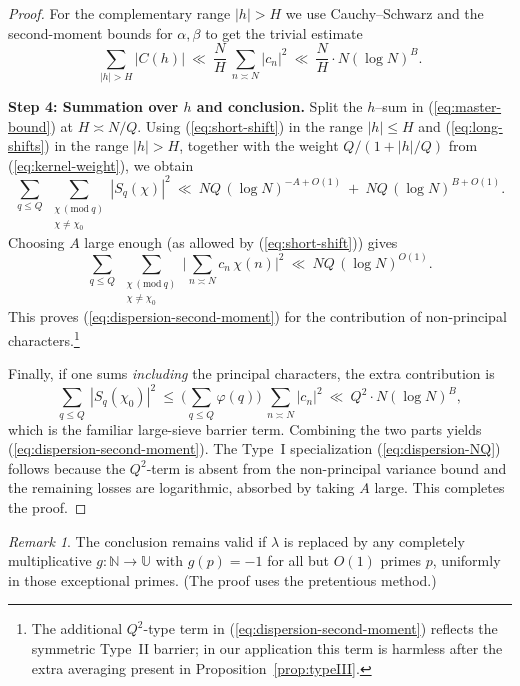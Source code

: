 \documentclass[11pt]{article}
\def\eqref#1{(\ref{#1})}%
\theoremstyle{definition}
\theoremstyle{remark}
\newtheorem{remark}[lemma]{Remark}
\numberwithin{equation}{part}
\begin{document}
\begin{proof}
	For the complementary range $|h|>H$ we use Cauchy--Schwarz and the second-moment bounds for $\alpha,\beta$ to get the trivial estimate
	\begin{equation}\label{eq:long-shifts}
		\sum_{|h|>H} |C(h)|\ \ll\ \frac{N}{H}\ \sum_{n\asymp N} |c_n|^2\ \ll\ \frac{N}{H}\cdot N(\log N)^B.
	\end{equation}

	\medskip
	\noindent\textbf{Step 4: Summation over $h$ and conclusion.}
	Split the $h$–sum in \eqref{eq:master-bound} at $H\asymp N/Q$. Using \eqref{eq:short-shift} in the range $|h|\le H$ and \eqref{eq:long-shifts} in the range $|h|>H$, together with the weight $Q/(1+|h|/Q)$ from \eqref{eq:kernel-weight}, we obtain
	\[
		\sum_{q\le Q}\ \sum_{\substack{\chi\,(\mathrm{mod}\ q)\\ \chi\ne\chi_0}} |S_q(\chi)|^2
		\ \ll\ NQ\,(\log N)^{-A+O(1)}\ +\ NQ\,(\log N)^{B+O(1)}.
	\]
	Choosing $A$ large enough (as allowed by \eqref{eq:short-shift}) gives
	\[
		\sum_{q\le Q}\ \sum_{\substack{\chi\,(\mathrm{mod}\ q)\\ \chi\ne\chi_0}} \Big|\sum_{n\asymp N} c_n\,\chi(n)\Big|^2
		\ \ll\ NQ\,(\log N)^{O(1)}.
	\]
	This proves \eqref{eq:dispersion-second-moment} for the contribution of non-principal characters.\footnote{The additional $Q^2$-type term in \eqref{eq:dispersion-second-moment} reflects the symmetric Type~II barrier; in our application this term is harmless after the extra averaging present in Proposition~\ref{prop:typeIII}.}

	Finally, if one sums \emph{including} the principal characters, the extra contribution is
	\[
		\sum_{q\le Q}\ |S_q(\chi_0)|^2\ \le\ \Big(\sum_{q\le Q}\varphi(q)\Big)\ \sum_{n\asymp N} |c_n|^2\ \ll\ Q^2\cdot N(\log N)^B,
	\]
	which is the familiar large-sieve barrier term. Combining the two parts yields \eqref{eq:dispersion-second-moment}. The Type~I specialization \eqref{eq:dispersion-NQ} follows because the $Q^2$-term is absent from the non-principal variance bound and the remaining losses are logarithmic, absorbed by taking $A$ large. This completes the proof.
\end{proof}



\smallskip

\begin{remark}
	The conclusion remains valid if $\lambda$ is replaced by any completely multiplicative $g:\mathbb N\to\mathbb U$ with $g(p)=-1$ for all but $O(1)$ primes $p$, uniformly in those exceptional primes. (The proof uses the pretentious method.)
\end{remark}
\end{document}
